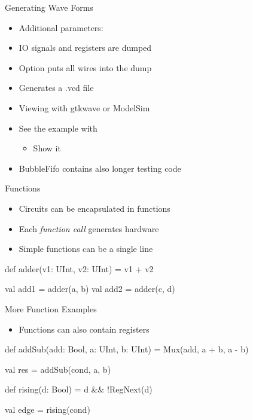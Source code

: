 \begin{frame}[fragile]{Generating Wave Forms}
\begin{itemize}
\item Additional parameters: 
\item IO signals and registers are dumped
\item Option  puts all wires into the dump
\item Generates a .vcd file
\item Viewing with gtkwave or ModelSim
\item See the example with 
\begin{itemize}
\item Show it
\end{itemize}
\item BubbleFifo contains also longer testing code
\end{itemize}
\end{frame}

\begin{frame}[fragile]{Functions}
\begin{itemize}
\item Circuits can be encapsulated in functions
\item Each \emph{function call} generates hardware
\item Simple functions can be a single line
\end{itemize}
\begin{chisel}
  def adder(v1: UInt, v2: UInt) = v1 + v2
  
  val add1 = adder(a, b)
  val add2 = adder(c, d)
\end{chisel}
\end{frame}

\begin{frame}[fragile]{More Function Examples}
\begin{itemize}
\item Functions can also contain registers
\end{itemize}
\begin{chisel}
  def addSub(add: Bool, a: UInt, b: UInt) =
    Mux(add, a + b, a - b)

  val res = addSub(cond, a, b)

  def rising(d: Bool) = d && !RegNext(d)

  val edge = rising(cond)
\end{chisel}
\end{frame}

